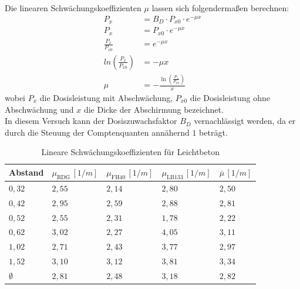 \documentclass[12pt,german]{article}
\begin{document}
    Die linearen Schwächungskoeffizienten $\mu$ lassen sich folgendermaßen berechnen:
    \begin{align*}
        P_x &= B_D \cdot P_{x0} \cdot e^{-\mu x} \\[5pt]
        P_x &= P_{x0} \cdot e^{-\mu x} \\[5pt]
        \frac{P_x}{P_{x0}} &= e^{-\mu x} \\[6pt]
        ln\left(\frac{P_x}{P_{x0}}\right) &= -\mu x \\
        \mu &= -\frac{\ln\left(\frac{P_x}{P_{x0}}\right)}{x}
    \end{align*}
    wobei $P_x$ die Dosisleistung mit Abschwächung, $P_{x0}$ die Dosisleistung ohne Abschwächung und $x$ die Dicke der Abschirmung bezeichnet. \\
    In diesem Versuch kann der Dosiszuwachsfaktor $B_D$ vernachlässigt werden, da er durch die Steuung der Comptenquanten annähernd $1$ beträgt.
    \begin{table}[H]
        \centering
        \begin{tabularx}{\textwidth}{X|X|X|X|X}
            \toprule
            \textbf{Abstand} & $ \mu_{\text{RDG}}\, [1/m] $ & $ \mu_{\text{FH40}}\, [1/m]  $ & $ \mu_{\text{LB133}}\, [1/m]  $ & $ \overline{\mu}\, [1/m]  $ \\
            \midrule
            $   0,32 $ & $   2,55 $ & $   2,14 $ & $   2,80 $ & $   2,50 $ \\
            $   0,42 $ & $   2,95 $ & $   2,59 $ & $   2,88 $ & $   2,81 $ \\
            $   0,52 $ & $   2,55 $ & $   2,31 $ & $   1,78 $ & $   2,22 $ \\
            $   0,62 $ & $   3,02 $ & $   2,27 $ & $   4,05 $ & $   3,11 $ \\
            $   1,02 $ & $   2,71 $ & $   2,43 $ & $   3,77 $ & $   2,97 $ \\
            $   1,52 $ & $   3,10 $ & $   3,12 $ & $   3,81 $ & $   3,34 $ \\
            \midrule
            $\emptyset$ & $   2,81 $ & $   2,48 $ & $   3,18 $ & $   2,82 $ \\
            \bottomrule
        \end{tabularx}
        \caption{Lineare Schwächungskoeffizienten für Leichtbeton}
    \end{table}
\end{document}
